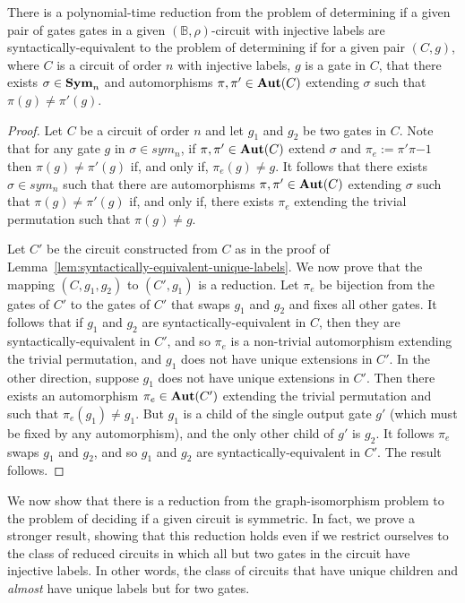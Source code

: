 \documentclass[../paper.tex]{subfiles}
\begin{document}
\begin{lem}
  There is a polynomial-time reduction from the problem of determining if a
  given pair of gates gates in a given $(\mathbb{B}, \rho)$-circuit with
  injective labels are syntactically-equivalent to the problem of determining if
  for a given pair $(C, g)$, where $C$ is a circuit of order $n$ with injective
  labels, $g$ is a gate in $C$, that there exists $\sigma \in \text{\textbf{Sym}}_n$ and
  automorphisms $\pi, \pi' \in \text{\textbf{Aut}}(C)$ extending $\sigma$ such that $\pi (g)
  \neq \pi' (g)$.
  \label{lem:syntactically-equivilent-unique-extensions}
\end{lem}
\begin{proof}
  Let $C$ be a circuit of order $n$ and let $g_1$ and $g_2$ be two gates in $C$.
  Note that for any gate $g$ in $\sigma \in sym_n$, if $\pi, \pi' \in \text{\textbf{Aut}}(C)$
  extend $\sigma$ and $\pi_e := \pi'\pi{-1}$ then $\pi(g) \neq \pi'(g)$ if, and
  only if, $\pi_e (g) \neq g$. It follows that there exists $\sigma \in sym_n$
  such that there are automorphisms $\pi, \pi' \in \text{\textbf{Aut}}(C)$ extending $\sigma$
  such that $\pi (g) \neq \pi'(g)$ if, and only if, there exists $\pi_e$
  extending the trivial permutation such that $\pi (g) \neq g$.

  Let $C'$ be the circuit constructed from $C$ as in the proof of
  Lemma~\ref{lem:syntactically-equivalent-unique-labels}. We now prove that the
  mapping $(C, g_1, g_2)$ to $(C', g_1)$ is a reduction. Let $\pi_e$ be
  bijection from the gates of $C'$ to the gates of $C'$ that swaps $g_1$ and
  $g_2$ and fixes all other gates. It follows that if $g_1$ and $g_2$ are
  syntactically-equivalent in $C$, then they are syntactically-equivalent in
  $C'$, and so $\pi_e$ is a non-trivial automorphism extending the trivial
  permutation, and $g_1$ does not have unique extensions in $C'$. In the other
  direction, suppose $g_1$ does not have unique extensions in $C'$. Then there
  exists an automorphism $\pi_e \in \text{\textbf{Aut}}(C')$ extending the trivial permutation
  and such that $\pi_e(g_1) \neq g_1$. But $g_1$ is a child of the single output
  gate $g'$ (which must be fixed by any automorphism), and the only other child
  of $g'$ is $g_2$. It follows $\pi_e$ swaps $g_1$ and $g_2$, and so $g_1$ and
  $g_2$ are syntactically-equivalent in $C'$. The result follows.
\end{proof}

We now show that there is a reduction from the graph-isomorphism problem to the
problem of deciding if a given circuit is symmetric. In fact, we prove a
stronger result, showing that this reduction holds even if we restrict ourselves
to the class of reduced circuits in which all but two gates in the circuit have
injective labels. In other words, the class of circuits that have unique
children and \emph{almost} have unique labels but for two gates.
\end{document}
